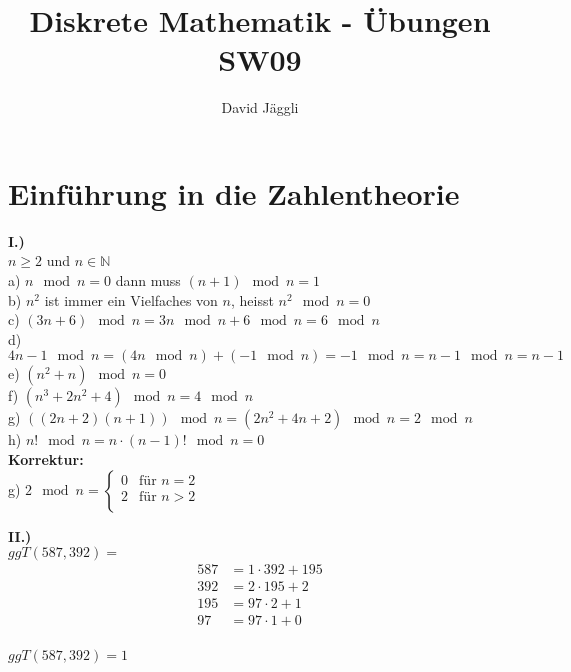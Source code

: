 \documentclass[12pt]{scrartcl}
\author{David Jäggli}
\title{Diskrete Mathematik - Übungen SW09}
\begin{document}
\maketitle

\tableofcontents

\newpage
\section{Einführung in die Zahlentheorie}
\textbf{I.)}\\
$n \geq 2$ und $n \in \mathbb{N}$\\

a) $n \mod n = 0$ dann muss $(n+1) \mod n = 1$\\
b) $n^2$ ist immer ein Vielfaches von $n$, heisst $n^2 \mod n = 0$\\
c) $(3n+6) \mod n = 3n \mod n + 6 \mod n = 6 \mod n$\\
d) $4n -1 \mod n = (4n \mod n) + (-1 \mod n) = -1 \mod n = n - 1 \mod n = n - 1$ \\
e) $(n^2 + n) \mod n = 0$\\
f) $(n^3 + 2n^2 + 4) \mod n = 4 \mod n$\\
g) $((2n + 2)(n + 1)) \mod n = (2n^2 + 4n + 2) \mod n = 2 \mod n$\\
h) $n! \mod n = n \cdot (n-1)! \mod n = 0$\\


\textbf{Korrektur:}\\
g)
$ 2 \mod n = 
    \begin{cases} 
    0               & \text{für } n = 2 \\
    2               & \text{für } n > 2\\
 \end{cases}
$


\vspace{1cm}
\textbf{II.)}\\
$ggT(587, 392) = $\\
\begin{align*}
    587 &= 1 \cdot 392 + 195 \\
    392 &= 2 \cdot 195 + 2 \\
    195 &= 97 \cdot 2 + 1 \\
    97  &= 97 \cdot 1 + 0  \\
\end{align*}

$ggT(587, 392) = 1$\\
\end{document}
